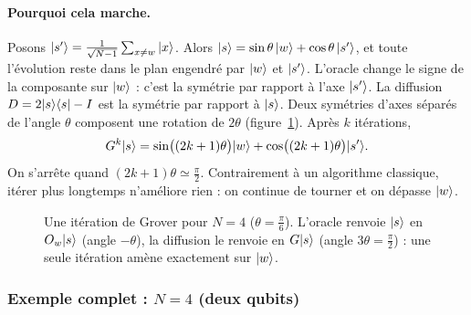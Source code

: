 \paragraph{Pourquoi cela marche.} Posons $|s'\rangle=\frac{1}{\sqrt{N-1}}\sum_{x\neq w}|x\rangle$. Alors
$|s\rangle=\sin\theta\,|w\rangle+\cos\theta\,|s'\rangle$, et toute l'évolution reste dans le plan
engendré par $|w\rangle$ et $|s'\rangle$. L'oracle change le signe de la composante sur $|w\rangle$ : c'est
la symétrie par rapport à l'axe $|s'\rangle$. La diffusion $D=2|s\rangle\langle s|-I$ est la symétrie par
rapport à $|s\rangle$. Deux symétries d'axes séparés de l'angle $\theta$ composent une rotation de
$2\theta$ (figure~\ref{fig:grover-geo}). Après $k$ itérations,
\[
  G^k|s\rangle=\sin\!\big((2k+1)\theta\big)|w\rangle+\cos\!\big((2k+1)\theta\big)|s'\rangle.
\]
On s'arrête quand $(2k+1)\theta\simeq\frac\pi2$. Contrairement à un algorithme classique, itérer plus
longtemps n'améliore rien : on continue de tourner et on dépasse $|w\rangle$.

\begin{figure}[!ht]
\centering
{}
\caption{Une itération de Grover pour $N=4$ ($\theta=\frac\pi6$). L'oracle renvoie $|s\rangle$ en
$O_w|s\rangle$ (angle $-\theta$), la diffusion le renvoie en $G|s\rangle$ (angle $3\theta=\frac\pi2$) :
une seule itération amène exactement sur $|w\rangle$.}
\label{fig:grover-geo}
\end{figure}

\subsubsection{Exemple complet : $N=4$ (deux qubits)}

